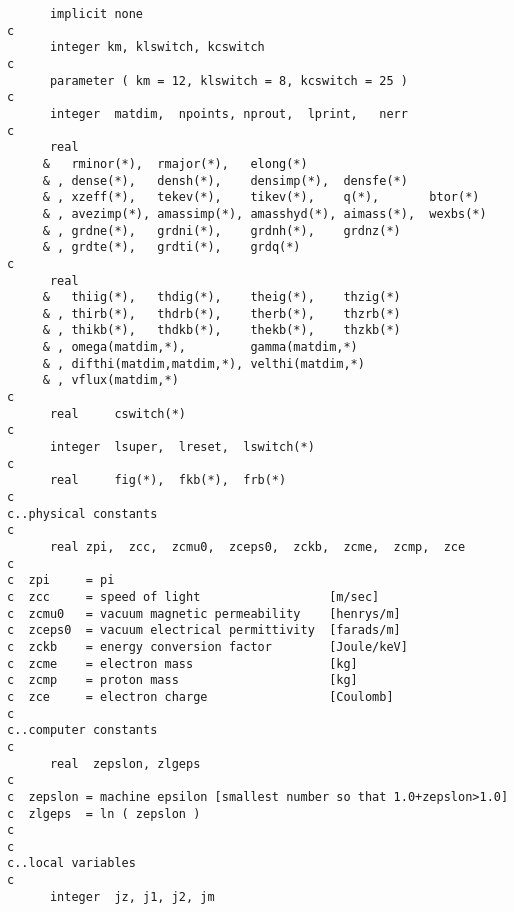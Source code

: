 \begin{verbatim}
      implicit none
c
      integer km, klswitch, kcswitch
c
      parameter ( km = 12, klswitch = 8, kcswitch = 25 )
c
      integer  matdim,  npoints, nprout,  lprint,   nerr
c
      real
     &   rminor(*),  rmajor(*),   elong(*)
     & , dense(*),   densh(*),    densimp(*),  densfe(*)
     & , xzeff(*),   tekev(*),    tikev(*),    q(*),       btor(*)
     & , avezimp(*), amassimp(*), amasshyd(*), aimass(*),  wexbs(*)
     & , grdne(*),   grdni(*),    grdnh(*),    grdnz(*)
     & , grdte(*),   grdti(*),    grdq(*)
c
      real  
     &   thiig(*),   thdig(*),    theig(*),    thzig(*)
     & , thirb(*),   thdrb(*),    therb(*),    thzrb(*)
     & , thikb(*),   thdkb(*),    thekb(*),    thzkb(*)
     & , omega(matdim,*),         gamma(matdim,*)
     & , difthi(matdim,matdim,*), velthi(matdim,*)
     & , vflux(matdim,*)
c
      real     cswitch(*)
c
      integer  lsuper,  lreset,  lswitch(*)
c
      real     fig(*),  fkb(*),  frb(*)
c
c..physical constants
c
      real zpi,  zcc,  zcmu0,  zceps0,  zckb,  zcme,  zcmp,  zce
c
c  zpi     = pi
c  zcc     = speed of light                  [m/sec]
c  zcmu0   = vacuum magnetic permeability    [henrys/m]
c  zceps0  = vacuum electrical permittivity  [farads/m]
c  zckb    = energy conversion factor        [Joule/keV]
c  zcme    = electron mass                   [kg]
c  zcmp    = proton mass                     [kg]
c  zce     = electron charge                 [Coulomb]
c
c..computer constants
c
      real  zepslon, zlgeps
c
c  zepslon = machine epsilon [smallest number so that 1.0+zepslon>1.0]
c  zlgeps  = ln ( zepslon )
c
c
c..local variables
c
      integer  jz, j1, j2, jm


\end{verbatim}
